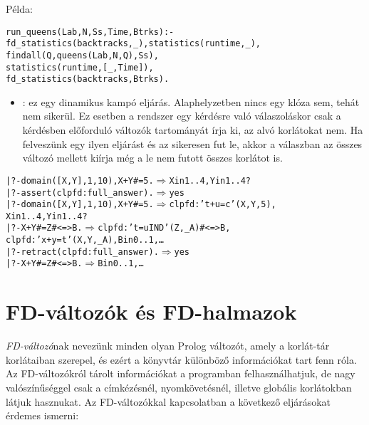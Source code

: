 Példa:

\begin{alltt}
% Az N-királynő feladat összes megoldása Ss, Lab címkézéssel való
% végrehajtása Time msec-ig tart és Btrks FD visszalépést igényel.
run_queens(Lab, N, Ss, Time, Btrks) :-
        fd_statistics(backtracks, _), statistics(runtime, _),
        findall(Q, queens(Lab, N, Q), Ss),
        statistics(runtime, [_,Time]),
        fd_statistics(backtracks, Btrks).
\end{alltt}

\begin{itemize}
\item {}: ez egy dinamikus kampó eljárás.
        Alaphelyzetben nincs egy klóza sem, tehát nem sikerül. Ez
        esetben a rendszer egy kérdésre való válaszoláskor csak a
        kérdésben előforduló változók tartományát írja ki, az alvó
        korlátokat nem. Ha felveszünk egy ilyen eljárást és az sikeresen
        fut le, akkor a válaszban az összes változó mellett kiírja még a
        le nem futott összes korlátot is.  
\end{itemize}

\begin{alltt}
| ?- domain([X,Y], 1, 10), X+Y#=5. \(\Rightarrow\) X in 1..4, Y in 1..4 ? 
| ?- assert(clpfd:full_answer).    \(\Rightarrow\) yes
| ?- domain([X,Y], 1, 10), X+Y#=5. \(\Rightarrow\) clpfd:'t+u=c'(X,Y,5), 
                                      X in 1..4, Y in 1..4 ? 
| ?- X+Y #= Z #<=> B.              \(\Rightarrow\) clpfd:'t=u IND'(Z,_A)#<=>B,
                                      clpfd:'x+y=t'(X,Y,_A), B in 0..1, \ldots
| ?- retract(clpfd:full_answer).   \(\Rightarrow\) yes
| ?- X+Y #= Z #<=> B.              \(\Rightarrow\) B in 0..1, \ldots
\end{alltt}

\section{FD-változók és FD-halmazok}
\label{fdset}

 \emph{FD-változó}nak nevezünk minden olyan Prolog változót,
amely a korlát-tár korlátaiban szerepel, és ezért a \clpfd könyvtár különböző
információkat tart fenn róla. Az FD-változókról tárolt információkat a
programban felhasználhatjuk, de nagy valószínűséggel csak a címkézésnél,
nyomkövetésnél, illetve globális korlátokban látjuk hasznukat.
\br
Az FD-változókkal kapcsolatban a következő eljárásokat érdemes ismerni:

